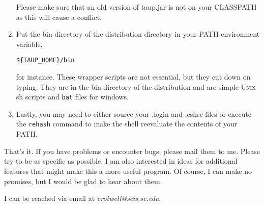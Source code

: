 \begin{enumerate}
Please make sure that an old version of taup.jar is not on your CLASSPATH as this will cause a
conflict.

\item Put the bin directory of the distribution directory in your PATH environment
variable, \begin{verbatim}${TAUP_HOME}/bin\end{verbatim} for instance. These wrapper
scripts are not essential, but they cut down on
typing. They are in the bin directory of the distribution
and are simple \textsc{Unix} sh scripts and \texttt{bat} files for windows.

\item Lastly, you may need to either source your .login and .cshrc files or
execute the \texttt{rehash} command to make the shell reevaluate the
contents of your PATH.

\end{enumerate}

That's it. If you have problems or encounter bugs, please mail them to me.
Please try to be as specific as possible. I am also interested in ideas for
additional features that might make this a more useful program.
Of course, I can make no promises,
but I would be glad to hear about them.

I can be reached via email at \textit{crotwell@seis.sc.edu}.
